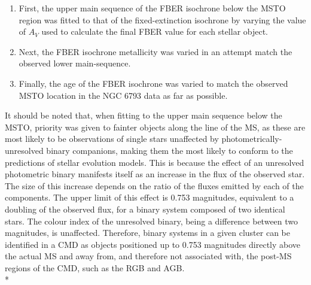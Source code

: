 \documentclass[12pt, a4paper]{report}
\begin{document}
\begin{enumerate}
\item First, the upper main sequence of the FBER isochrone below the MSTO region was fitted to that of the fixed-extinction isochrone by varying the value of $A_{V}$ used to calculate the final FBER value for each stellar object.
\item Next, the FBER isochrone metallicity was varied in an attempt match the observed lower main-sequence.
\item Finally, the age of the FBER isochrone was varied to match the observed MSTO location in the NGC 6793 data as far as possible.
\end{enumerate}

It should be noted that, when fitting  to the upper main sequence below the MSTO, priority was given to fainter objects along the line of the MS, as these are most likely to be observations of single stars unaffected by photometrically-unresolved binary companions, making them the most likely to conform to the predictions of stellar evolution models. This is because the effect of an unresolved photometric binary manifests itself as an increase in the flux of the observed star. The size of this increase depends on the ratio of the fluxes emitted by each of the components. The upper limit of this effect is 0.753 magnitudes, equivalent to a doubling of the observed flux, for a binary system composed of two identical stars. The colour index of the unresolved binary, being a difference between two magnitudes, is unaffected. Therefore, binary systems in a given cluster can be identified in a CMD as objects positioned up to 0.753 magnitudes directly above the actual MS and away from, and therefore not associated with, the post-MS regions of the CMD, such as the RGB and AGB. \\*
\end{document}
